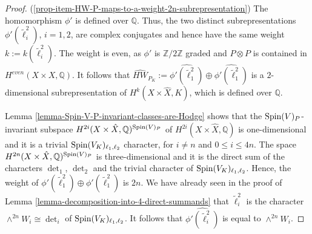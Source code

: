 \documentclass[12pt]{amsart}
\numberwithin{equation}{subsection}
\theoremstyle{plain}
\theoremstyle{definition}
\newcommand{\QQ}{{\mathbb Q}}
\newcommand{\ZZ}{{\mathbb Z}}
\newcommand{\Spin}{{\rm Spin}}
\begin{document}
\begin{proof} 
(\ref{prop-item-HW-P-maps-to-a-weight-2n-subrepresentation})
The homomorphism $\phi'$ is defined over $\QQ$. Thus, the two distinct subrepresentations $\phi'(\tilde{\ell}_i^2)$, $i=1,2$, are complex conjugates and hence have the same weight $k:=k(\tilde{\ell}_i^2)$. The weight is even, as $\phi'$ is $\ZZ/2\ZZ$ graded and $P\otimes P$ is contained in $H^{even}(X\times X,\QQ)$. 
It follows that $\hat{HW}_{P_K}:=\widehat{\phi'(\tilde{\ell}_1^2)}\oplus \widehat{\phi'(\tilde{\ell}_1^2)}$
is a $2$-dimensional subrepresentation of $H^k(X\times\hat{X},K)$, which is defined over $\QQ$.

Lemma \ref{lemma-Spin-V-P-invariant-classes-are-Hodge} shows that the $\Spin(V)_P$-invariant subspace 
$H^{2i}(X\times \hat{X},\QQ)^{\Spin(V)_P}$ of $H^{2i}(X\times \hat{X},\QQ)$
is one-dimensional and it is a trivial $\Spin(V_K)_{\ell_1,\ell_2}$ character, for $i\neq n$ and $0\leq i\leq 4n$. 
The space $H^{2n}(X\times \hat{X},\QQ)^{\Spin(V)_P}$ is three-dimensional and it is the direct sum of the characters $\det_1$, $\det_2$ and the trivial character of $\Spin(V_K)_{\ell_1,\ell_2}$. Hence, the weight of 
$\phi'(\tilde{\ell}_1^2)\oplus\phi'(\tilde{\ell}_1^2)$ is $2n$. 
We have already seen in the proof of Lemma \ref{lemma-decomposition-into-4-direct-summands} that $\tilde{\ell}_i^2$ is the character $\wedge^{2n}W_i\cong\det_i$ of $\Spin(V_K)_{\ell_1,\ell_2}$.
It follows that $\widehat{\phi'(\tilde{\ell}_i^2)}$ is equal to $\wedge^{2n}W_i$.


\end{proof}
\end{document}
